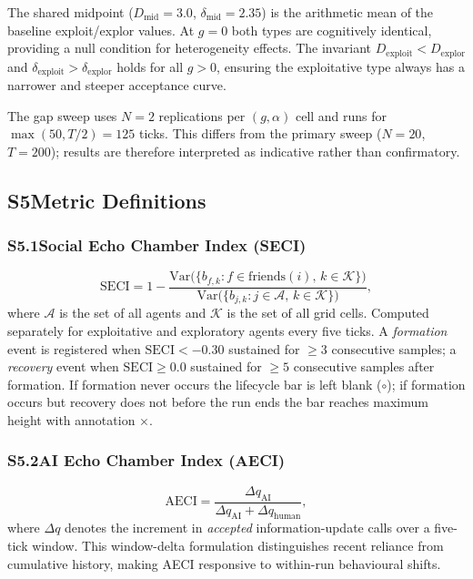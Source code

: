 \documentclass[pdflatex,sn-apa]{sn-jnl}%
\begin{document}
\begin{appendices}
The shared midpoint ($D_{\mathrm{mid}}=3.0$, $\delta_{\mathrm{mid}}=2.35$) is
the arithmetic mean of the baseline exploit/explor values.
At $g=0$ both types are cognitively identical, providing a null condition for
heterogeneity effects.
The invariant $D_{\mathrm{exploit}}<D_{\mathrm{explor}}$ and
$\delta_{\mathrm{exploit}}>\delta_{\mathrm{explor}}$ holds for all $g>0$,
ensuring the exploitative type always has a narrower and steeper acceptance curve.

The gap sweep uses $N=2$ replications per $(g,\alpha)$ cell and runs for
$\max(50,T/2)=125$ ticks.
This differs from the primary sweep ($N=20$, $T=200$); results are therefore
interpreted as indicative rather than confirmatory.

\subsection*{S5\quad Metric Definitions}

\subsubsection*{S5.1\enspace Social Echo Chamber Index (SECI)}

\begin{equation}
  \mathrm{SECI} = 1 -
    \frac{\mathrm{Var}\!\bigl(\{b_{f,k}:f\in\mathrm{friends}(i),\,k\in\mathcal{K}\}\bigr)}
         {\mathrm{Var}\!\bigl(\{b_{j,k}:j\in\mathcal{A},\,k\in\mathcal{K}\}\bigr)},
  \tag{S5}
\end{equation}
%
where $\mathcal{A}$ is the set of all agents and $\mathcal{K}$ is the set of all
grid cells.
Computed separately for exploitative and exploratory agents every five ticks.
A \emph{formation} event is registered when $\mathrm{SECI}<-0.30$ sustained for
$\geq3$ consecutive samples; a \emph{recovery} event when
$\mathrm{SECI}\geq0.0$ sustained for $\geq5$ consecutive samples after formation.
If formation never occurs the lifecycle bar is left blank ($\circ$); if formation
occurs but recovery does not before the run ends the bar reaches maximum height
with annotation $\times$.

\subsubsection*{S5.2\enspace AI Echo Chamber Index (AECI)}

\begin{equation}
  \mathrm{AECI} = \frac{\Delta q_{\mathrm{AI}}}
                       {\Delta q_{\mathrm{AI}} + \Delta q_{\mathrm{human}}},
  \tag{S6}
\end{equation}
%
where $\Delta q$ denotes the increment in \emph{accepted} information-update
calls over a five-tick window.
This window-delta formulation distinguishes recent reliance from cumulative
history, making AECI responsive to within-run behavioural shifts.


\end{appendices}
\end{document}
